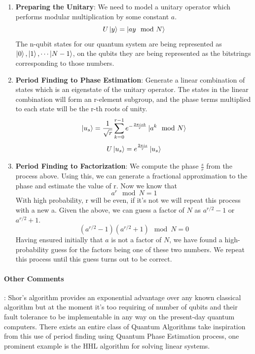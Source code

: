 \begin{enumerate}
    \item \textbf{Preparing the Unitary}: We need to model a unitary operator which performs modular multiplication by some constant $a$.
    \begin{equation}
        U \ket{y} = \ket{ay \mod N}
    \end{equation}
    The n-qubit states for our quantum system are being represented as $\ket{0}, \ket{1}, \cdots \ket{N - 1}$, on the qubits they are being represented as the bitstrings corresponding to those numbers.
    \item \textbf{Period Finding to Phase Estimation}: Generate a linear combination of states which is an eigenstate of the unitary operator. The states in the linear combination will form an r-element subgroup, and the phase terms multiplied to each state will be the r-th roots of unity.
    \begin{equation}
        \ket{u_s} = \frac{1}{\sqrt{r}} \sum_{k=0}^{r-1} e^{-\frac{2\pi i s k}{r}} \ket{a^k \mod N}
    \end{equation}
    \begin{equation}
        U \ket{u_s} = e^{\frac{2 \pi i s}{r}} \ket{u_s}
    \end{equation}
    \item \textbf{Period Finding to Factorization}: We compute the phase $\frac{s}{r}$ from the process above. Using this, we can generate a fractional approximation to the phase and estimate the value of r. Now we know that
    \begin{equation}
        a^r \mod N = 1
    \end{equation}
    With high probability, r will be even, if it's not we will repeat this process with a new a. Given the above, we can guess a factor of $N$ as $a^{r/2} - 1$ or $a^{r/2} + 1$.
    \begin{equation}
        (a^{r/2} - 1) (a^{r/2} + 1) \mod N = 0
    \end{equation}
    Having ensured initially that $a$ is not a factor of $N$, we have found a high-probability guess for the factors being one of these two numbers. We repeat this process until this guess turns out to be correct.
\end{enumerate}

\paragraph*{Other Comments}: Shor's algorithm provides an exponential advantage over any known classical algorithm but at the moment it's too requiring of number of qubits and their fault tolerance to be implementable in any way on the present-day quantum computers. There exists an entire class of Quantum Algorithms take inspiration from this use of period finding using Quantum Phase Estimation process, one prominent example is the HHL algorithm for solving linear systems.

